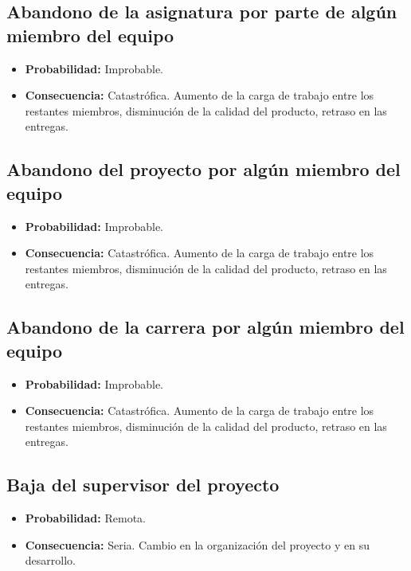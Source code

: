 \documentclass[spanish,a4paper,12pt]{report}	%
\begin{document}
	\subsection*{Abandono de la asignatura por parte de algún miembro del equipo}	
		\begin{itemize}
			\item \textbf {Probabilidad: }Improbable.
			\item \textbf {Consecuencia: }Catastrófica. Aumento de la carga de trabajo entre los restantes miembros, disminución de la calidad del producto, retraso en las entregas.
		\end{itemize}
	
	\subsection*{Abandono del proyecto por algún miembro del equipo}	
		\begin{itemize}
			\item \textbf {Probabilidad: }Improbable.
			\item \textbf {Consecuencia: }Catastrófica. Aumento de la carga de trabajo entre los restantes miembros, disminución de la calidad del producto, retraso en las entregas.
		\end{itemize}
	
	\subsection*{Abandono de la carrera por algún miembro del equipo}
		\begin{itemize}
			\item \textbf {Probabilidad: }Improbable.
			\item \textbf {Consecuencia: }Catastrófica. Aumento de la carga de trabajo entre los restantes miembros, disminución de la calidad del producto, retraso en las entregas.
		\end{itemize}
	
	\subsection*{Baja del supervisor del proyecto}
		\begin{itemize}
			\item \textbf {Probabilidad: }Remota.
			\item \textbf {Consecuencia: }Seria. Cambio en la organización del proyecto y en su desarrollo.
		\end{itemize}
\end{document}
